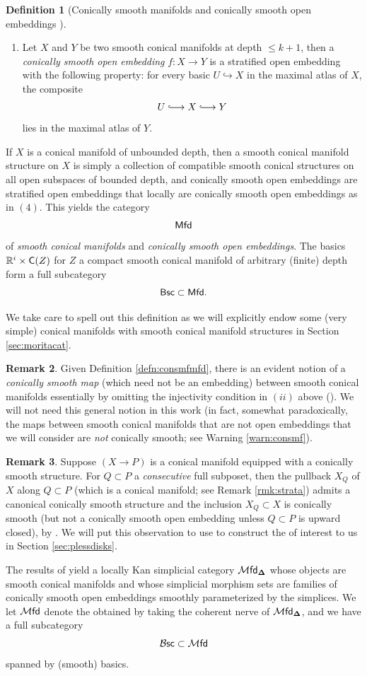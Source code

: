 \documentclass[10pt, reqno, twoside
, final
]{amsart}
\numberwithin{equation}{subsection}%
\theoremstyle{definition}
\newtheorem{defn}{Definition}[subsection]
\theoremstyle{definition}
\theoremstyle{definition}
\theoremstyle{definition}
\theoremstyle{definition}
\theoremstyle{definition}
\theoremstyle{definition}
\theoremstyle{definition}
\theoremstyle{definition}
\theoremstyle{plain}
\theoremstyle{definition}
\theoremstyle{plain}
\theoremstyle{definition}
\theoremstyle{plain}
\theoremstyle{definition}
\newtheorem{rmk}[defn]{Remark}
\theoremstyle{definition}
\theoremstyle{plain}
\theoremstyle{plain}
\theoremstyle{definition}
\theoremstyle{plain}
\theoremstyle{plain}
\theoremstyle{plain}
\begin{document}
\begin{defn}[Conically smooth manifolds and conically smooth open embeddings \cite{AFT-local-structures}]
\begin{enumerate}[$(1)$]
    \item Let $X$ and $Y$ be two smooth conical manifolds at depth $\leq k+1$, then a \emph{conically smooth open embedding} $f:X\rightarrow Y$ is a stratified open embedding with the following property: for every basic $U\hookrightarrow X$ in the maximal atlas of $X$, the composite
    \[  U\hooklongrightarrow X\hooklongrightarrow Y  \]
    lies in the maximal atlas of $Y$.
\end{enumerate}
If $X$ is a conical manifold of unbounded depth, then a smooth conical manifold structure on $X$ is simply a collection of compatible smooth conical structures on all open subspaces of bounded depth, and conically smooth open embeddings are stratified open embeddings that locally are conically smooth open embeddings as in $(4)$. This yields the category 
\[  \mathsf{Mfd} \]
of \emph{smooth conical manifolds} and \emph{conically smooth open embeddings}. The basics $\mathbb{R}^i\times\mathsf{C}(Z)$ for $Z$ a compact smooth conical manifold of arbitrary (finite) depth form a full subcategory 
\[  \mathsf{Bsc} \subset \mathsf{Mfd}.\]
\end{defn}
We take care to spell out this definition as we will explicitly endow some (very simple) conical manifolds with smooth conical manifold structures in Section \ref{sec:moritacat}.
\begin{rmk}
Given Definition \ref{defn:consmfmfd}, there is an evident notion of a \emph{conically smooth map} (which need not be an embedding) between smooth conical manifolds essentially by omitting the injectivity condition in $(ii)$ above (\cite[Definition 3.3.1]{AFT-local-structures}). We will not need this general notion in this work (in fact, somewhat paradoxically, the maps between smooth conical manifolds that are not open embeddings that we will consider are \emph{not} conically smooth; see Warning \ref{warn:consmf}).
\end{rmk}
\begin{rmk}
Suppose $(X\rightarrow P)$ is a conical manifold equipped with a conically smooth structure. For $Q\subset P$ a \emph{consecutive} full subposet, then the pullback $X_Q$ of $X$ along $Q\subset P$ (which is a conical manifold; see Remark \ref{rmk:strata}) admits a canonical conically smooth structure and the inclusion $X_Q\subset X$ is conically smooth (but not a conically smooth open embedding unless $Q\subset P$ is upward closed), by \cite[Lemma 3.4.5]{AFT-local-structures}. We will put this observation to use to construct the \infops of interest to us in Section \ref{sec:plessdisks}.
\end{rmk}
The results of \cite[Section 4.1]{AFT-local-structures} yield a locally Kan simplicial category $\mathcal{M}\mathsf{fd}_{\boldsymbol{\Delta}}$ whose objects are smooth conical manifolds and whose simplicial morphism sets are families of conically smooth open embeddings smoothly parameterized by the simplices. We let 
\(  \mathcal{M}\mathsf{fd} \)
denote the \infcat obtained by taking the coherent nerve of $\mathcal{M}\mathsf{fd}_{\boldsymbol{\Delta}}$, and we have a full subcategory 
\[ \mathcal{B}\mathsf{sc} \subset \mathcal{M}\mathsf{fd}\]
spanned by (smooth) basics.
\end{document}
